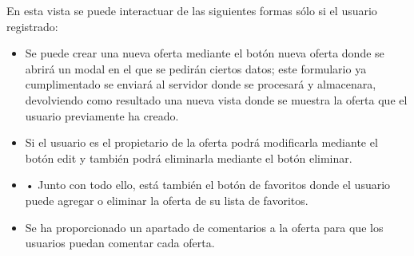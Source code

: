 En esta vista se puede interactuar de las siguientes formas sólo si el usuario registrado:
\begin{itemize}
\item Se puede crear una nueva oferta mediante el botón nueva oferta donde se abrirá un modal en el que se pedirán ciertos datos; este formulario ya cumplimentado se enviará al servidor donde se procesará y almacenara, devolviendo como resultado una nueva vista donde se muestra la oferta que el usuario previamente ha creado.
\item Si el usuario es el propietario de la oferta podrá modificarla mediante el botón edit y también podrá eliminarla mediante el botón eliminar.
\item •	Junto con todo ello, está también el botón de favoritos donde el usuario puede agregar o eliminar la oferta de su lista de favoritos.  
\item Se ha proporcionado un apartado de comentarios a la oferta para que los usuarios puedan comentar cada oferta.
\end{itemize}

